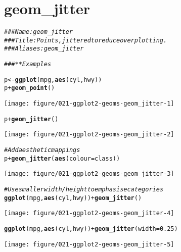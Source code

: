 \documentclass[a4paper,titlepage]{tufte-handout}\usepackage[]{graphicx}\usepackage[]{color}
\makeatletter
\def\maxwidth{ %
  \ifdim\Gin@nat@width>\linewidth
    \linewidth
  \else
    \Gin@nat@width
  \fi
}
\newcommand{\hlnum}[1]{\textcolor[rgb]{0.686,0.059,0.569}{#1}}%
\newcommand{\hlcom}[1]{\textcolor[rgb]{0.678,0.584,0.686}{\textit{#1}}}%
\newcommand{\hlopt}[1]{\textcolor[rgb]{0,0,0}{#1}}%
\newcommand{\hlstd}[1]{\textcolor[rgb]{0.345,0.345,0.345}{#1}}%
\newcommand{\hlkwb}[1]{\textcolor[rgb]{0.69,0.353,0.396}{#1}}%
\newcommand{\hlkwc}[1]{\textcolor[rgb]{0.333,0.667,0.333}{#1}}%
\newcommand{\hlkwd}[1]{\textcolor[rgb]{0.737,0.353,0.396}{\textbf{#1}}}%
\newenvironment{kframe}{%
 \def\at@end@of@kframe{}%
 \ifinner\ifhmode%
  \def\at@end@of@kframe{\end{minipage}}%
  \begin{minipage}{\columnwidth}%
 \fi\fi%
 \def\FrameCommand##1{\hskip\@totalleftmargin \hskip-\fboxsep
 \colorbox{shadecolor}{##1}\hskip-\fboxsep
     \hskip-\linewidth \hskip-\@totalleftmargin \hskip\columnwidth}%
 \MakeFramed {\advance\hsize-\width
   \@totalleftmargin\z@ \linewidth\hsize
   \@setminipage}}%
 {\par\unskip\endMakeFramed%
 \at@end@of@kframe}
\newenvironment{knitrout}{}{} %
\makeatother
\begin{document}
\section{geom\_jitter}

\begin{knitrout}
\color{fgcolor}\begin{kframe}
\begin{alltt}
\hlcom{### Name: geom_jitter}
\hlcom{### Title: Points, jittered to reduce overplotting.}
\hlcom{### Aliases: geom_jitter}

\hlcom{### ** Examples}

\hlstd{p} \hlkwb{<-} \hlkwd{ggplot}\hlstd{(mpg,} \hlkwd{aes}\hlstd{(cyl, hwy))}
\hlstd{p} \hlopt{+} \hlkwd{geom_point}\hlstd{()}
\end{alltt}
\end{kframe}
\texttt{[image: figure/021-ggplot2-geoms-geom\_jitter-1]} 
\begin{kframe}\begin{alltt}
\hlstd{p} \hlopt{+} \hlkwd{geom_jitter}\hlstd{()}
\end{alltt}
\end{kframe}
\texttt{[image: figure/021-ggplot2-geoms-geom\_jitter-2]} 
\begin{kframe}\begin{alltt}
\hlcom{# Add aesthetic mappings}
\hlstd{p} \hlopt{+} \hlkwd{geom_jitter}\hlstd{(}\hlkwd{aes}\hlstd{(}\hlkwc{colour} \hlstd{= class))}
\end{alltt}
\end{kframe}
\texttt{[image: figure/021-ggplot2-geoms-geom\_jitter-3]} 
\begin{kframe}\begin{alltt}
\hlcom{# Use smaller width/height to emphasise categories}
\hlkwd{ggplot}\hlstd{(mpg,} \hlkwd{aes}\hlstd{(cyl, hwy))} \hlopt{+} \hlkwd{geom_jitter}\hlstd{()}
\end{alltt}
\end{kframe}
\texttt{[image: figure/021-ggplot2-geoms-geom\_jitter-4]} 
\begin{kframe}\begin{alltt}
\hlkwd{ggplot}\hlstd{(mpg,} \hlkwd{aes}\hlstd{(cyl, hwy))} \hlopt{+} \hlkwd{geom_jitter}\hlstd{(}\hlkwc{width} \hlstd{=} \hlnum{0.25}\hlstd{)}
\end{alltt}
\end{kframe}
\texttt{[image: figure/021-ggplot2-geoms-geom\_jitter-5]} 

\end{knitrout}
\end{document}
